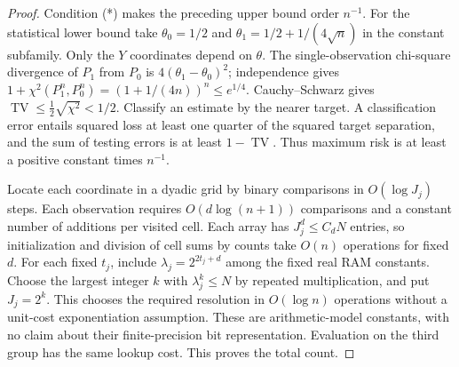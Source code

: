 \documentclass[11pt]{article}
\theoremstyle{remark}
\newcommand{\TV}{\operatorname{TV}}
\begin{document}
\begin{proof}
Condition (*) makes the preceding upper bound order $n^{-1}$.
For the statistical lower bound take $\theta_0=1/2$ and
$\theta_1=1/2+1/(4\sqrt n)$ in the constant subfamily. Only the $Y$
coordinates depend on $\theta$. The single-observation chi-square
divergence of $P_1$ from $P_0$ is $4(\theta_1-\theta_0)^2$; independence
gives $1+\chi^2(P_1^n,P_0^n)=(1+1/(4n))^n\leq e^{1/4}$.
Cauchy--Schwarz gives $\TV\leq\frac12\sqrt{\chi^2}<1/2$.
Classify an estimate by the nearer target. A classification error entails
squared loss at least one quarter of the squared target separation, and
the sum of testing errors is at least $1-\TV$. Thus maximum risk is at
least a positive constant times $n^{-1}$.

Locate each coordinate in a dyadic grid by binary comparisons in
$O(\log J_j)$ steps. Each observation requires $O(d\log(n+1))$
comparisons and a constant number of additions per visited cell. Each
array has $J_j^d\leq C_d N$ entries, so initialization and division of
cell sums by counts take $O(n)$ operations for fixed $d$. For each fixed $t_j$, include $\lambda_j=2^{2t_j+d}$ among the fixed
real RAM constants. Choose the largest integer $k$ with $\lambda_j^k\leq N$
by repeated multiplication, and put $J_j=2^k$. This chooses the required
resolution in $O(\log n)$ operations without a unit-cost exponentiation
assumption. These are arithmetic-model constants, with no claim about
their finite-precision bit representation. Evaluation on the
third group has the same lookup cost. This proves the total count.


\end{proof}
\end{document}
